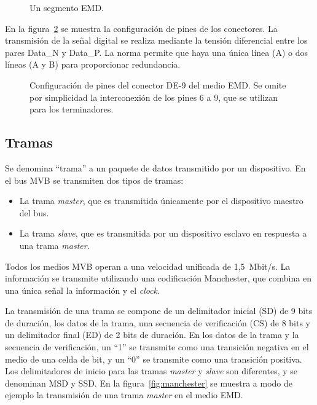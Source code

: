 \begin{figure}[htbp]
	\centering
    {
        \fontsize{9pt}{9pt}\selectfont
        
    }
	\caption[Un segmento EMD]{Un segmento EMD.}
    \label{fig:segmento}
\end{figure}

En la figura~\ref{fig:db9} se muestra la configuración de pines de los conectores.
La transmisión de la señal digital se realiza mediante la tensión diferencial entre los pares Data\_N y Data\_P. La norma permite que haya una única línea (A) o dos líneas (A y B) para proporcionar redundancia.

\begin{figure}[htbp]
	\centering
    {
        \fontsize{8pt}{8pt}\selectfont
        
    }
	\caption[Configuración de pines del conector D-sub de 9 pines del medio EMD]{Configuración de pines del conector DE-9 del medio EMD. Se omite por simplicidad la interconexión de los pines 6 a 9, que se utilizan para los terminadores.}
    \label{fig:db9}
\end{figure}

\subsection{Tramas}

Se denomina ``trama'' a un paquete de datos transmitido por un dispositivo.
En el bus MVB se transmiten dos tipos de tramas:

\begin{itemize}
\item La trama \textit{master}, que es transmitida únicamente por el dispositivo maestro del bus.
\item La trama \textit{slave}, que es transmitida por un dispositivo esclavo en respuesta a una trama \textit{master}.
\end{itemize}

Todos los medios MVB operan a una velocidad unificada de 1,5~Mbit/s.
La información se transmite utilizando una codificación Manchester, que combina en una única señal la información y el \textit{clock}.

La transmisión de una trama se compone de un delimitador inicial (SD) de 9 bits de duración, los datos de la trama, una secuencia de verificación (CS) de 8 bits y un delimitador final (ED) de 2 bits de duración.
En los datos de la trama y la secuencia de verificación, un ``1'' se transmite como una transición negativa en el medio de una celda de bit, y un ``0'' se transmite como una transición positiva.
Los delimitadores de inicio para las tramas \textit{master} y \textit{slave} son diferentes, y se denominan MSD y SSD.
En la figura~\ref{fig:manchester} se muestra a modo de ejemplo la transmisión de una trama \textit{master} en el medio EMD.

